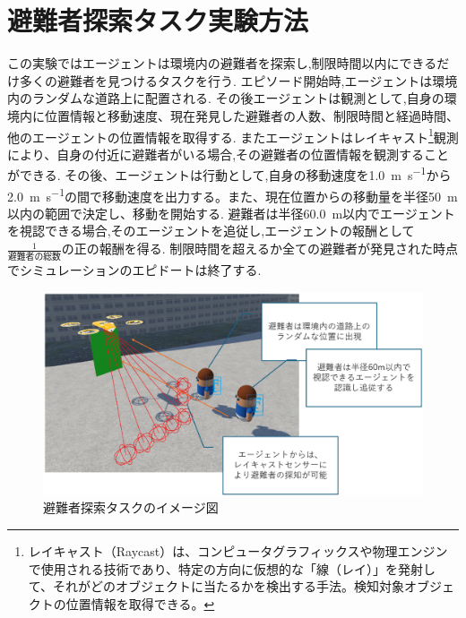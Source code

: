 \section{避難者探索タスク実験方法}
この実験ではエージェントは環境内の避難者を探索し,制限時間以内にできるだけ多くの避難者を見つけるタスクを行う.
エピソード開始時,エージェントは環境内のランダムな道路上に配置される.
その後エージェントは観測として,自身の環境内に位置情報と移動速度、現在発見した避難者の人数、制限時間と経過時間、他のエージェントの位置情報を取得する.
またエージェントはレイキャスト\footnote{レイキャスト（Raycast）は、コンピュータグラフィックスや物理エンジンで使用される技術であり、特定の方向に仮想的な「線（レイ）」を発射して、それがどのオブジェクトに当たるかを検出する手法。検知対象オブジェクトの位置情報を取得できる。}観測により、自身の付近に避難者がいる場合,その避難者の位置情報を観測することができる.
その後、エージェントは行動として,自身の移動速度を\SI{1.0}{\meter\per\second}から\SI{2.0}{\meter\per\second}の間で移動速度を出力する。また、現在位置からの移動量を半径\SI{50}{\meter}以内の範囲で決定し、移動を開始する.
避難者は半径\SI{60.0}{\meter}以内でエージェントを視認できる場合,そのエージェントを追従し,エージェントの報酬として$\frac{1}{避難者の総数}$の正の報酬を得る.
制限時間を超えるか全ての避難者が発見された時点でシミュレーションのエピドートは終了する.
\begin{figure}[H] 
  \centering 
  \includegraphics[width=1.0\textwidth]{Figures/SearchEx.png}
  \caption{避難者探索タスクのイメージ図} 
  \label{fig:01} 
\end{figure}
